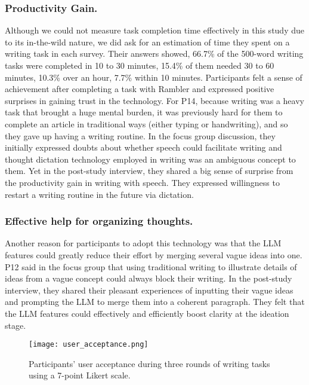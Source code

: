 \subsubsection{Productivity Gain.} Although we could not measure task completion time effectively in this study due to its in-the-wild nature, we did ask for an estimation of time they spent on a writing task in each survey. Their answers showed, 66.7\% of the 500-word writing tasks were completed in 10 to 30 minutes, 15.4\% of them needed 30 to 60 minutes, 10.3\% over an hour, 7.7\% within 10 minutes.
Participants felt a sense of achievement after completing a task with Rambler and expressed positive surprises in gaining trust in the technology. For P14, because writing was a heavy task that brought a huge mental burden, it was previously hard for them to complete an article in traditional ways (either typing or handwriting), and so they gave up having a writing routine.
In the focus group discussion, they initially expressed doubts about whether speech could facilitate writing and thought dictation technology employed in writing was an ambiguous concept to them. Yet in the post-study interview, they shared a big sense of surprise from the productivity gain in writing with speech.
They expressed willingness to restart a writing routine in the future via dictation. 

\subsubsection{Effective help for organizing thoughts.} Another reason for participants to adopt this technology was that the LLM features could greatly reduce their effort by merging several vague ideas into one. P12 said in the focus group that using traditional writing to illustrate details of ideas from a vague concept could always block their writing. 
In the post-study interview, they shared their pleasant experiences of inputting their vague ideas and prompting the LLM to merge them into a coherent paragraph. They felt that the LLM features could effectively and efficiently boost clarity at the ideation stage.

\begin{figure}
    \centering
    \texttt{[image: user\_acceptance.png]}
    \caption{Participants' user acceptance during three rounds of writing tasks using a 7-point Likert scale.}
    \label{fig:useracc}
\end{figure}

